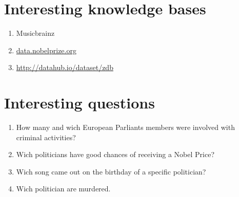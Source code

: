 \documentclass[11pt,a4paper]{article}
\begin{document}
\section{Interesting knowledge bases}
\begin{enumerate}

\item Musicbrainz
\item \url{data.nobelprize.org}
\item \url{http://datahub.io/dataset/zdb}

\end{enumerate}
\section{Interesting questions}
\begin{enumerate}
\item How many and wich European Parliants members were involved with criminal activities?
\item Wich politicians have good chances of receiving a Nobel Price?
\item Wich song came out on the birthday of a specific politician?
\item Wich politician are murdered.
\end{enumerate}
\end{document}
